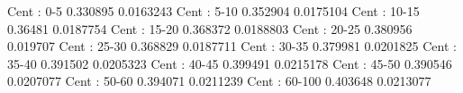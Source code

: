 Cent : 0-5
0.330895 0.0163243
Cent : 5-10
0.352904 0.0175104
Cent : 10-15
0.36481 0.0187754
Cent : 15-20
0.368372 0.0188803
Cent : 20-25
0.380956 0.019707
Cent : 25-30
0.368829 0.0187711
Cent : 30-35
0.379981 0.0201825
Cent : 35-40
0.391502 0.0205323
Cent : 40-45
0.399491 0.0215178
Cent : 45-50
0.390546 0.0207077
Cent : 50-60
0.394071 0.0211239
Cent : 60-100
0.403648 0.0213077

